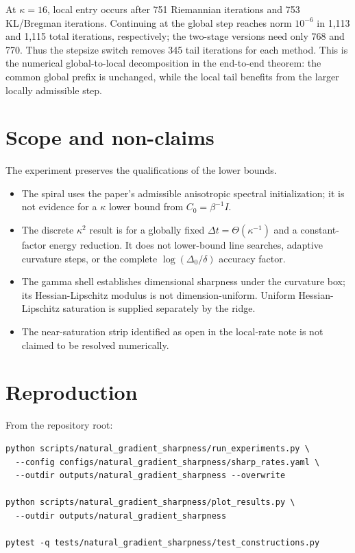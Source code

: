 \documentclass[11pt]{article}
\begin{document}
At $\kappa=16$, local entry occurs after 751 Riemannian iterations and 753
KL/Bregman iterations.  Continuing at the global step reaches norm $10^{-6}$
in 1,113 and 1,115 total iterations, respectively; the two-stage versions need
only 768 and 770.  Thus the stepsize switch removes 345 tail iterations for
each method.  This is the numerical global-to-local decomposition in
the end-to-end theorem: the common global prefix is unchanged, while the local
tail benefits from the larger locally admissible step.

\section{Scope and non-claims}

The experiment preserves the qualifications of the lower bounds.
\begin{itemize}
\item The spiral uses the paper's admissible anisotropic spectral
initialization; it is not evidence for a $\kappa$ lower bound from
$C_0=\beta^{-1}I$.
\item The discrete $\kappa^2$ result is for a globally fixed
$\Delta t=\Theta(\kappa^{-1})$ and a constant-factor energy reduction.  It
does not lower-bound line searches, adaptive curvature steps, or the complete
$\log(\Delta_0/\delta)$ accuracy factor.
\item The gamma shell establishes dimensional sharpness under the curvature
box; its Hessian-Lipschitz modulus is not dimension-uniform.  Uniform
Hessian-Lipschitz saturation is supplied separately by the ridge.
\item The near-saturation strip identified as open in the local-rate note is
not claimed to be resolved numerically.
\end{itemize}

\section{Reproduction}

From the repository root:
\begin{verbatim}
python scripts/natural_gradient_sharpness/run_experiments.py \
  --config configs/natural_gradient_sharpness/sharp_rates.yaml \
  --outdir outputs/natural_gradient_sharpness --overwrite

python scripts/natural_gradient_sharpness/plot_results.py \
  --outdir outputs/natural_gradient_sharpness

pytest -q tests/natural_gradient_sharpness/test_constructions.py
\end{verbatim}
\end{document}
